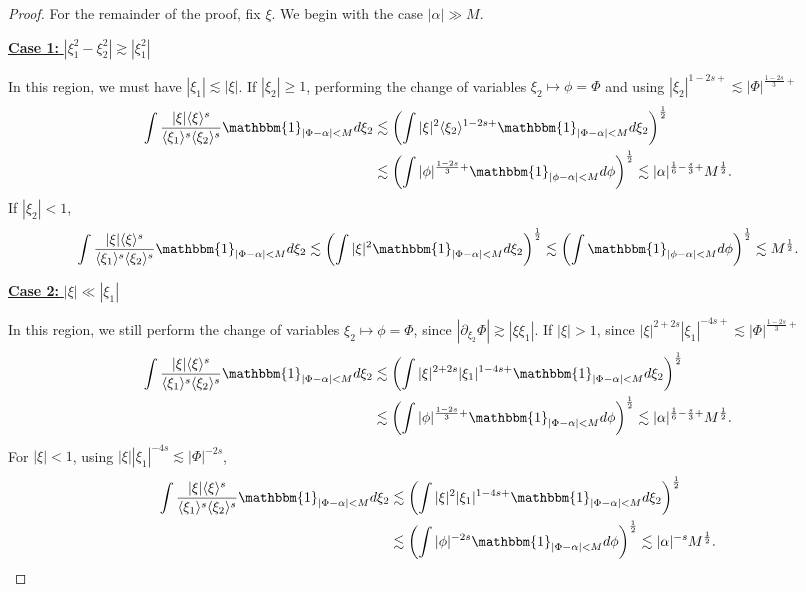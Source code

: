 \documentclass[%
11pt,  reqno]{amsart}
\newcommand{\fia}{\mathbbm{1}_{|\Phi-\alpha|<M}}
\newcommand{\jap}[1]{\langle #1 \rangle}
\newcommand{\5}{\textup{V}}
\newcommand{\noi}{\noindent}
\theoremstyle{remark}
\numberwithin{equation}{section}
\numberwithin{theorem}{section}
\begin{document}
\begin{proof}
\medskip

For the remainder of the proof, fix $\xi$. We begin with the case $|\alpha|\gg M$.

\smallskip

\noi
\underline{
\textbf{Case 1:} $|\xi_1^2-\xi_2^2| \gtrsim |\xi_1^2|$}

In this region, we must have $|\xi_1|\lesssim |\xi|$. If $|\xi_2|\ge 1$, performing the change of variables $\xi_2\mapsto \phi=\Phi$ and using $|\xi_2|^{1-2s+}\lesssim |\Phi|^{\frac{1-2s}{3}+}$
\begin{align*}
     \int \frac{|\xi|\jap{\xi}^s}{\jap{\xi_1}^s\jap{\xi_2}^s}\fia d\xi_2 &\lesssim \left(\int |\xi|^2\jap{\xi_2}^{1-2s+}\fia d\xi_2\right)^\frac12\\&\lesssim \left(\int |\phi|^{\frac{1-2s}{3}+}\mathbbm{1}_{|\phi-\alpha|<M} d\phi\right)^\frac12\lesssim |\alpha|^{\frac16 - \frac s3 +} M^{\frac12}.
\end{align*}
If $|\xi_2|<1$,
\begin{align*}
     \int \frac{|\xi|\jap{\xi}^s}{\jap{\xi_1}^s\jap{\xi_2}^s}\fia d\xi_2 \lesssim \left(\int |\xi|^2\fia d\xi_2\right)^\frac12\lesssim \left(\int \mathbbm{1}_{|\phi-\alpha|<M} d\phi\right)^\frac12\lesssim M^{\frac12}.
\end{align*}

\smallskip

\noi
\underline{ 
\textbf{Case 2:} $|\xi| \ll |\xi_1|$} 

In this region, we still perform the change of variables $\xi_2\mapsto \phi=\Phi$, since $|\partial_{\xi_2}\Phi|\gtrsim |\xi\xi_1|$. If $|\xi|>1$, since $|\xi|^{2+2s}|\xi_1|^{-4s+}\lesssim |\Phi|^{\frac{1-2s}{3}+} $
\begin{align*}
    \int \frac{|\xi|\jap{\xi}^s}{\jap{\xi_1}^s\jap{\xi_2}^s}\fia d\xi_2 &\lesssim \left(\int |\xi|^{2+2s}|\xi_1|^{1-4s+}\fia d\xi_2\right)^\frac12\\& \lesssim \left(\int |\phi|^{\frac{1-2s}{3}+}\fia d\phi\right)^\frac12\lesssim |\alpha|^{\frac16 - \frac s3 +} M^{\frac12}.
\end{align*}
For $|\xi|<1$, using $|\xi||\xi_1|^{-4s}\lesssim |\Phi|^{-2s}$,
\begin{align*}
    \int \frac{|\xi|\jap{\xi}^s}{\jap{\xi_1}^s\jap{\xi_2}^s}\fia d\xi_2 &\lesssim \left(\int |\xi|^{2}|\xi_1|^{1-4s+}\fia d\xi_2\right)^\frac12\\& \lesssim \left(\int |\phi|^{-2s}\fia d\phi\right)^\frac12\lesssim |\alpha|^{-s} M^{\frac12}.
\end{align*}




\end{proof}
\end{document}
